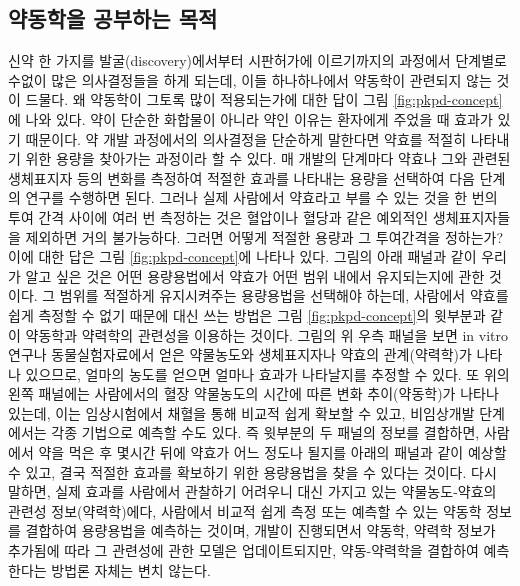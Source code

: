 \documentclass[
  11pt,
  krantz2, a4paper, twoside]{krantz}
\theoremstyle{definition}
\theoremstyle{definition}
\theoremstyle{definition}
\theoremstyle{definition}
\theoremstyle{remark}
\begin{document}

\subsection{약동학을 공부하는 목적}\label{uxc57duxb3d9uxd559uxc744-uxacf5uxbd80uxd558uxb294-uxbaa9uxc801}


신약 한 가지를 발굴(discovery)에서부터 시판허가에 이르기까지의 과정에서
단계별로 수없이 많은 의사결정들을 하게 되는데, 이들 하나하나에서
약동학이 관련되지 않는 것이 드물다. 왜 약동학이 그토록 많이 적용되는가에
대한 답이 그림 \ref{fig:pkpd-concept}에 나와 있다. 약이 단순한 화합물이 아니라 약인 이유는
환자에게 주었을 때 효과가 있기 때문이다. 약 개발 과정에서의 의사결정을
단순하게 말한다면 약효를 적절히 나타내기 위한 용량을 찾아가는 과정이라
할 수 있다. 매 개발의 단계마다 약효나 그와 관련된 생체표지자 등의 변화를
측정하여 적절한 효과를 나타내는 용량을 선택하여 다음 단계의 연구를
수행하면 된다. 그러나 실제 사람에서 약효라고 부를 수 있는 것을 한 번의
투여 간격 사이에 여러 번 측정하는 것은 혈압이나 혈당과 같은 예외적인
생체표지자들을 제외하면 거의 불가능하다. 그러면 어떻게 적절한 용량과 그
투여간격을 정하는가? 이에 대한 답은 그림 \ref{fig:pkpd-concept}에 나타나 있다. 그림의 아래
패널과 같이 우리가 알고 싶은 것은 어떤 용량용법에서 약효가 어떤 범위
내에서 유지되는지에 관한 것이다. 그 범위를 적절하게 유지시켜주는
용량용법을 선택해야 하는데, 사람에서 약효를 쉽게 측정할 수 없기 때문에
대신 쓰는 방법은 그림 \ref{fig:pkpd-concept}의 윗부분과 같이 약동학과 약력학의 관련성을
이용하는 것이다. 그림의 위 우측 패널을 보면 in vitro 연구나
동물실험자료에서 얻은 약물농도와 생체표지자나 약효의 관계(약력학)가
나타나 있으므로, 얼마의 농도를 얻으면 얼마나 효과가 나타날지를 추정할 수
있다. 또 위의 왼쪽 패널에는 사람에서의 혈장 약물농도의 시간에 따른 변화
추이(약동학)가 나타나 있는데, 이는 임상시험에서 채혈을 통해 비교적 쉽게
확보할 수 있고, 비임상개발 단계에서는 각종 기법으로 예측할 수도 있다.
즉 윗부분의 두 패널의 정보를 결합하면, 사람에서 약을 먹은 후 몇시간 뒤에 약효가 어느 정도나 될지를 아래의 패널과 같이 예상할 수 있고,
결국 적절한 효과를 확보하기 위한 용량용법을 찾을 수 있다는 것이다. 다시
말하면, 실제 효과를 사람에서 관찰하기 어려우니 대신 가지고 있는
약물농도-약효의 관련성 정보(약력학)에다, 사람에서 비교적 쉽게 측정 또는
예측할 수 있는 약동학 정보를 결합하여 용량용법을 예측하는 것이며, 개발이
진행되면서 약동학, 약력학 정보가 추가됨에 따라 그 관련성에 관한 모델은 업데이트되지만,
약동-약력학을 결합하여 예측한다는 방법론 자체는 변치 않는다.
\end{document}
